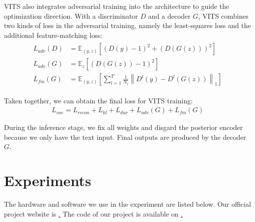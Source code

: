 \documentclass{article}
\begin{document}
VITS also integrates adversarial training into the architecture to guide the optimization direction. With a discriminator $D$ and a decoder $G$, VITS combines two kinds of loss in the adversarial training, namely the least-squares loss and the additional feature-matching loss:
\begin{align}
    \begin{split}
        L_{a d v}(D) & =\mathbb{E}_{(y, z)}\left[(D(y)-1)^{2}+(D(G(z)))^{2}\right] \\
        L_{a d v}(G) & =\mathbb{E}_{z}\left[(D(G(z))-1)^{2}\right] \\
        L_{f m}(G) & =\mathbb{E}_{(y, z)}\left[\sum_{l=1}^{T} \frac{1}{N_{l}}\left\|D^{l}(y)-D^{l}(G(z))\right\|_{1}\right]
    \end{split}
\end{align}

Taken together, we can obtain the final loss for VITS training:
\begin{align}
    L_{v a e}=L_{r e c o n}+L_{k l}+L_{d u r}+L_{a d v}(G)+L_{f m}(G)
\end{align}

During the inference stage, we fix all weights and disgard the posterior encoder because we only have the text input. Final outputs are produced by the decoder $G$.

\section{Experiments}
\label{sec:exper}
The hardware and software we use in the experiment are listed below. Our official project website is \href{https://sd12321sd.github.io/api_project.github.io/}. The code of our project is available on \href{ https://github.com/ShupeiLi/api-final-project/tree/master}.
\end{document}
